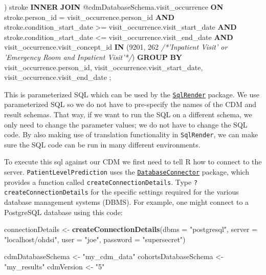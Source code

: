 \documentclass[]{book}
\newenvironment{Shaded}{\begin{snugshade}}{\end{snugshade}}
\newcommand{\KeywordTok}[1]{\textcolor[rgb]{0.13,0.29,0.53}{\textbf{#1}}}
\newcommand{\DataTypeTok}[1]{\textcolor[rgb]{0.13,0.29,0.53}{#1}}
\newcommand{\DecValTok}[1]{\textcolor[rgb]{0.00,0.00,0.81}{#1}}
\newcommand{\StringTok}[1]{\textcolor[rgb]{0.31,0.60,0.02}{#1}}
\newcommand{\CommentTok}[1]{\textcolor[rgb]{0.56,0.35,0.01}{\textit{#1}}}
\newcommand{\NormalTok}[1]{#1}
\begin{document}
\begin{Shaded}
\begin{Highlighting}[]
\NormalTok{) stroke}
\KeywordTok{INNER} \KeywordTok{JOIN}\NormalTok{ @cdmDatabaseSchema.visit_occurrence}
\KeywordTok{ON}\NormalTok{ stroke.person_id = visit_occurrence.person_id}
\KeywordTok{AND}\NormalTok{ stroke.condition_start_date >= visit_occurrence.visit_start_date}
\KeywordTok{AND}\NormalTok{ stroke.condition_start_date <= visit_occurrence.visit_end_date}
\KeywordTok{AND}\NormalTok{ visit_occurrence.visit_concept_id }\KeywordTok{IN}\NormalTok{ (}\DecValTok{9201}\NormalTok{, }\DecValTok{262} \CommentTok{/*'Inpatient Visit'  or }
\CommentTok{    'Emergency Room and Inpatient Visit'*/}\NormalTok{)}
\KeywordTok{GROUP} \KeywordTok{BY}\NormalTok{ visit_occurrence.person_id, visit_occurrence.visit_start_date, }
\NormalTok{         visit_occurrence.visit_end_date}
\NormalTok{;}
\end{Highlighting}
\end{Shaded}

This is parameterized SQL which can be used by the
\href{http://github.com/OHDSI/SqlRender}{\texttt{SqlRender}} package. We
use parameterized SQL so we do not have to pre-specify the names of the
CDM and result schemas. That way, if we want to run the SQL on a
different schema, we only need to change the parameter values; we do not
have to change the SQL code. By also making use of translation
functionality in \texttt{SqlRender}, we can make sure the SQL code can
be run in many different environments.

To execute this sql against our CDM we first need to tell R how to
connect to the server. \texttt{PatientLevelPrediction} uses the
\href{http://github.com/ohdsi/DatabaseConnector}{\texttt{DatabaseConnector}}
package, which provides a function called
\texttt{createConnectionDetails}. Type \texttt{?createConnectionDetails}
for the specific settings required for the various database management
systems (DBMS). For example, one might connect to a PostgreSQL database
using this code:

\begin{Shaded}
\begin{Highlighting}[]
\NormalTok{connectionDetails <-}\StringTok{ }\KeywordTok{createConnectionDetails}\NormalTok{(}\DataTypeTok{dbms =} \StringTok{"postgresql"}\NormalTok{, }
                                             \DataTypeTok{server =} \StringTok{"localhost/ohdsi"}\NormalTok{, }
                                             \DataTypeTok{user =} \StringTok{"joe"}\NormalTok{, }
                                             \DataTypeTok{password =} \StringTok{"supersecret"}\NormalTok{)}

\NormalTok{cdmDatabaseSchema <-}\StringTok{ "my_cdm_data"}
\NormalTok{cohortsDatabaseSchema <-}\StringTok{ "my_results"}
\NormalTok{cdmVersion <-}\StringTok{ "5"}
\end{Highlighting}
\end{Shaded}
\end{document}
